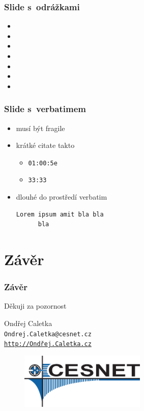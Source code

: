 \documentclass[hyperref={pdfpagelabels=false},xcolor=dvipsnames,12pt,aspectratio=169]{beamer}
\begin{document}
\begin{frame}
	\frametitle{Slide s~odrážkami}
	\begin{itemize}
		\item 
		\item 
		\item 
		\item 
		\item 
		\item 
		\item 
	\end{itemize}
\end{frame}

\begin{frame}[fragile]
	\frametitle{Slide s~verbatimem}
	\begin{itemize}
		\item musí být fragile
		\item krátké citate takto
		\begin{itemize}
				\item \verb|01:00:5e| 
				\item \verb|33:33|
		\end{itemize}
		\item dlouhé do prostředí verbatim
		\begin{verbatim}
Lorem ipsum amit bla bla 
      bla
		\end{verbatim}
	\end{itemize}
\end{frame}

\section*{Závěr}
{
\begin{frame}
 \frametitle{Závěr}
 \begin{center}
 \large Děkuji za pozornost

 \vspace{1cm}
 Ondřej Caletka\\
 \texttt{Ondrej.Caletka@cesnet.cz}\\
 \texttt{\href{http://xn--ondej-kcb.caletka.cz}{http://Ondřej.Caletka.cz}}
 \begin{figure}
 \includegraphics[width=6cm]{fig/cesnet-logo}
 \end{figure}
 \end{center}
\end{frame}
}
\end{document}
